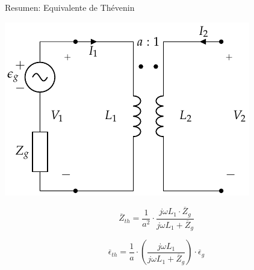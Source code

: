 \documentclass[xcolor={usenames,svgnames,dvipsnames}]{beamer}
\begin{document}
\begin{frame}[label={sec:orgb6da8ca}]{Resumen: Equivalente de Thévenin}
\begin{center}
\includegraphics[height=0.5\textheight]{../figs/Trafo_Perfecto_FuentePrimario.pdf}
\end{center}

\[
  \overline{Z}_{th} = \frac{1}{a^2} \cdot \frac{j \omega L_1 \cdot \overline{Z}_g}{j\omega L_1 + \overline{Z}_g}
\]

\[
  \overline{\epsilon}_{th} = \frac{1}{a} \cdot \left(\frac{j\omega L_1}{j\omega L_1 + \overline{Z}_g}\right) \cdot \overline{\epsilon}_g
\]
\end{frame}
\end{document}
